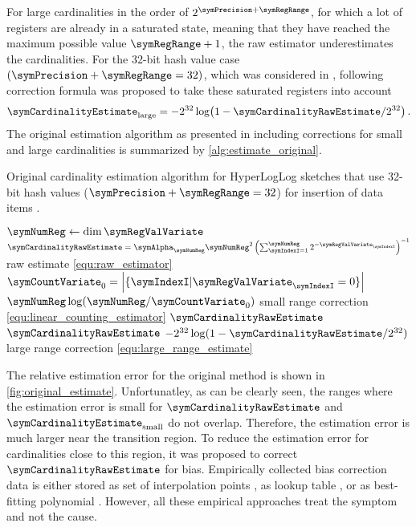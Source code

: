 \documentclass[a4paper]{scrartcl}
\begin{document}
For large cardinalities in the order of $2^{\symPrecision+\symRegRange}$, for which a lot of registers are already in a saturated state, meaning that they have reached the maximum possible value $\symRegRange + 1$, the raw estimator underestimates the cardinalities. For the 32-bit hash value case $(\symPrecision+\symRegRange=32)$, which was considered in \cite{Flajolet2007}, following correction formula was proposed to take these saturated registers into account
\begin{equation}
\label{equ:large_range_estimate}
\symCardinalityEstimate_\text{large}
=
-2^{32}\log\!\left(1-\symCardinalityRawEstimate/2^{32}\right).
\end{equation}
The original estimation algorithm as presented in \cite{Flajolet2007} including corrections for small and large cardinalities is summarized by \cref{alg:estimate_original}. 
\begin{algorithm}
\caption{Original cardinality estimation algorithm for HyperLogLog sketches that use 32-bit hash values ($\symPrecision+\symRegRange = 32$) for insertion of data items \cite{Flajolet2007}.}
\label{alg:estimate_original}
\begin{algorithmic}
\State $\symNumReg \gets \dim \boldsymbol{\symRegValVariate}$
\State $\symCardinalityRawEstimate = \symAlpha_\symNumReg \symNumReg^2\left(\sum_{\symIndexI=1}^\symNumReg 2^{-\symRegValVariate_\symIndexI}\right)^{-1}$
\Comment raw estimate \eqref{equ:raw_estimator}
\State $\symCountVariate_0 = \left|\{\symIndexI \vert\symRegValVariate_\symIndexI=0\}\right|$
\State \Return $\symNumReg \log(\symNumReg / \symCountVariate_0)$ \Comment small range correction \eqref{equ:linear_counting_estimator}
\Else
\State \Return $\symCardinalityRawEstimate$
\EndIf
{}
\State \Return $\symCardinalityRawEstimate$
\Else
\State\Return $-2^{32}\log(1-\symCardinalityRawEstimate/2^{32})$\Comment large range correction \eqref{equ:large_range_estimate}
\EndIf
\EndFunction
\end{algorithmic}
\end{algorithm}
The relative estimation error for the original method is shown in \cref{fig:original_estimate}. Unfortunatley, as can be clearly seen, the ranges where the estimation error is small for $\symCardinalityRawEstimate$ and $\symCardinalityEstimate_\text{small}$ do not overlap. Therefore, the estimation error is much larger near the transition region. To reduce the estimation error for cardinalities close to this region, it was proposed to correct $\symCardinalityRawEstimate$ for bias. Empirically collected bias correction data is either stored as set of interpolation points \cite{Heule2013}, as lookup table \cite{Rhodes2015}, or as best-fitting polynomial \cite{Sanfilippo2014}. However, all these empirical approaches treat the symptom and not the cause.
\end{document}
